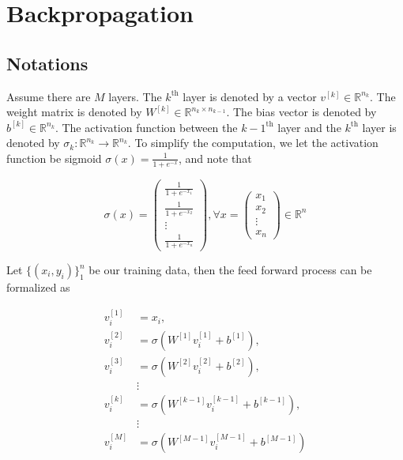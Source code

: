 \documentclass[../main.tex]{subfiles}
\begin{document}
    \section{Backpropagation}
        \subsection{Notations}
            Assume there are $M$ layers. The $k^\mathrm{th}$ layer is denoted
            by a vector $v^{ [k] }\in \mathbb{R}^{n_k}$. The weight matrix is
            denoted by $W^{ [k] }\in \mathbb{R}^{ n_k\times n_{k-1} }$. The
            bias vector is denoted by $b^{[k]} \in \mathbb{R}^{n_k}$. The
            activation function between the $k-1^{\mathrm{th}}$ layer and the
            $k^\mathrm{th}$ layer is denoted by $\sigma_k: \mathbb{R}^{n_k}
            \rightarrow \mathbb{R}^{n_k}$. To simplify the computation, we let
            the activation function be sigmoid
            $\sigma(x) = \frac{1}{1+e^{-x}}$, and note that

            \begin{equation*}
                \sigma(x) = \left( 
                    \begin{array}{c}
                        \frac{1}{1+e^{-x_1}} \\
                        \frac{1}{1+e^{-x_2}} \\
                        \vdots \\
                        \frac{1}{1+e^{-x_n}}                         
                    \end{array} \right),\forall x=\left(
                    \begin{array}{c}
                        x_1 \\
                        x_2 \\
                        \vdots \\
                        x_n
                    \end{array} \right) \in \mathbb{R}^n
            \end{equation*}
            
            Let $\{(x_i, y_i)\}_1^n$ be our training data, then the feed
            forward process can be formalized as 

            \begin{equation}\label{forward_nn}
                \begin{split}
                    v_i^{ [1] } & = x_i, \\
                    v_i^{ [2] } & = \sigma (W^{ [1] }v_i^{ [1] } + b^{ [1] }), \\
                    v_i^{ [3] } & = \sigma (W^{ [2] }v_i^{ [2] } + b^{ [2] }), \\
                    & \vdots\\
                    v_i^{ [k] } & = \sigma (W^{ [k-1] } v_i^{ [k-1] } + b^{ [k-1] }), \\
                    & \vdots\\
                    v_i^{ [M] } & = \sigma (W^{ [M-1] } v_i^{ [M-1] } + b^{ [M-1] })
                \end{split}
            \end{equation}
            
\end{document}
